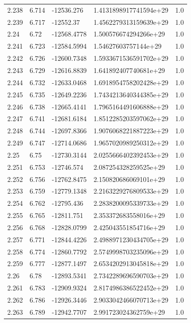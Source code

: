 \begin{tabular}{lllll}
2.238 & 6.714 & -12536.276 & 1.4131898917741594e+29 & 1.0 \\
2.239 & 6.717 & -12552.37 & 1.4562279313159639e+29 & 1.0 \\
2.24 & 6.72 & -12568.4778 & 1.500576674294266e+29 & 1.0 \\
2.241 & 6.723 & -12584.5994 & 1.54627603757144e+29 & 1.0 \\
2.242 & 6.726 & -12600.7348 & 1.5933671536591702e+29 & 1.0 \\
2.243 & 6.729 & -12616.8839 & 1.641892407740681e+29 & 1.0 \\
2.244 & 6.732 & -12633.0468 & 1.6918954758202428e+29 & 1.0 \\
2.245 & 6.735 & -12649.2236 & 1.7434213640344385e+29 & 1.0 \\
2.246 & 6.738 & -12665.4141 & 1.7965164491606888e+29 & 1.0 \\
2.247 & 6.741 & -12681.6184 & 1.8512285203597062e+29 & 1.0 \\
2.248 & 6.744 & -12697.8366 & 1.9076068221887223e+29 & 1.0 \\
2.249 & 6.747 & -12714.0686 & 1.9657020989250312e+29 & 1.0 \\
2.25 & 6.75 & -12730.3144 & 2.0255666402392453e+29 & 1.0 \\
2.251 & 6.753 & -12746.574 & 2.087254328259525e+29 & 1.0 \\
2.252 & 6.756 & -12762.8475 & 2.150820686069101e+29 & 1.0 \\
2.253 & 6.759 & -12779.1348 & 2.2163229276809533e+29 & 1.0 \\
2.254 & 6.762 & -12795.436 & 2.2838200095339733e+29 & 1.0 \\
2.255 & 6.765 & -12811.751 & 2.353372683558016e+29 & 1.0 \\
2.256 & 6.768 & -12828.0799 & 2.425043551854716e+29 & 1.0 \\
2.257 & 6.771 & -12844.4226 & 2.4988971230434705e+29 & 1.0 \\
2.258 & 6.774 & -12860.7792 & 2.5749998703235096e+29 & 1.0 \\
2.259 & 6.777 & -12877.1497 & 2.6534202913045818e+29 & 1.0 \\
2.26 & 6.78 & -12893.5341 & 2.7342289696590703e+29 & 1.0 \\
2.261 & 6.783 & -12909.9324 & 2.8174986386522452e+29 & 1.0 \\
2.262 & 6.786 & -12926.3446 & 2.9033042466070713e+29 & 1.0 \\
2.263 & 6.789 & -12942.7707 & 2.991723024362759e+29 & 1.0 \\

\end{tabular}
